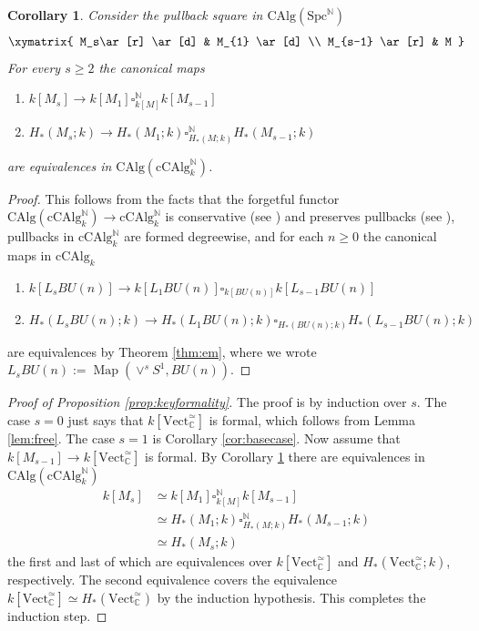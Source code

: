 \documentclass[oneside, a4paper, 12pt]{article}
\numberwithin{equation}{section}
\newcommand{\CAlg}{\mathrm{CAlg}}
\newcommand{\cCAlg}{\mathrm{cCAlg}}
\newcommand{\Spc}{\mathrm{Spc}}
\newcommand{\C}{\mathbb{C}}
\newcommand{\N}{\mathbb{N}}
\newcommand{\Vect}{\mathrm{Vect}}
\newcommand{\Map}{\operatorname{Map}}
\theoremstyle{plain}
\newtheorem{corollary}[theorem]{Corollary}
\theoremstyle{definition}
\theoremstyle{remark}
\begin{document}
\begin{corollary} \label{cor:equivalencechains}
Consider the pullback square in $\CAlg(\Spc^\N)$
\[
\xymatrix{
M_s\ar[r] \ar[d] & M_{1} \ar[d] \\
M_{s-1} \ar[r] & M
}
\]
For every $s\geq 2$ the canonical maps
\begin{enumerate}
\item[(1)] $k[M_s]\to k[M_1]\square^\N_{k[M]} k[M_{s-1}]$
\item[(2)] $H_\ast(M_s;k) \to H_\ast(M_1;k)\square^\N_{H_\ast(M;k)} H_\ast(M_{s-1};k)$
\end{enumerate}
are equivalences in $\CAlg(\cCAlg_k^\N)$.
\end{corollary}
\begin{proof}
This follows from the facts that the forgetful functor $\CAlg(\cCAlg_k^\N)\to \cCAlg_k^\N$ is conservative (see \cite[3.2.2.6]{HA}) and preserves pullbacks (see \cite[3.2.2.5]{HA}), pullbacks in $\cCAlg^\N_k$ are formed degreewise, and for each $n\geq 0$ the canonical maps in $\cCAlg_k$
\begin{enumerate}
\item[(1)] $k[L_sBU(n)] \to k[L_1 BU(n)] \square_{k[BU(n)]} k[L_{s-1}BU(n)]$
\item[(2)] $H_\ast(L_s BU(n);k) \to H_\ast(L_1BU(n);k) \square_{H_\ast(BU(n);k)} H_\ast(L_{s-1}BU(n);k)$
\end{enumerate}
are equivalences by Theorem \ref{thm:em}, where we wrote $L_sBU(n):=\Map(\vee^s S^1,BU(n))$.
\end{proof}


\begin{proof}[Proof of Proposition \ref{prop:keyformality}]
The proof is by induction over $s$. The case $s=0$ just says that $k[\Vect^\simeq_\C]$ is formal, which follows from Lemma \ref{lem:free}. The case $s=1$ is Corollary \ref{cor:basecase}. Now assume that $k[M_{s-1}]\to k[\Vect_\C^\simeq]$ is formal. By Corollary \ref{cor:equivalencechains} there are equivalences in $\CAlg(\cCAlg_k^\N)$
\begin{equation*}
\begin{split}
k[M_s] & \simeq k[M_1]\square^\N_{k[M]} k[M_{s-1}]\\& \simeq H_\ast(M_1;k)\square^\N_{H_\ast(M;k)} H_\ast(M_{s-1};k) \\&\simeq H_\ast(M_s;k)
\end{split}
\end{equation*}
the first and last of which are equivalences over $k[\Vect_\C^\simeq]$ and $H_\ast(\Vect_\C^\simeq;k)$, respectively. The second equivalence covers the equivalence $k[\Vect_\C^\simeq]\simeq H_\ast(\Vect_\C^\simeq)$ by the induction hypothesis. This completes the induction step.
\end{proof}
\end{document}
